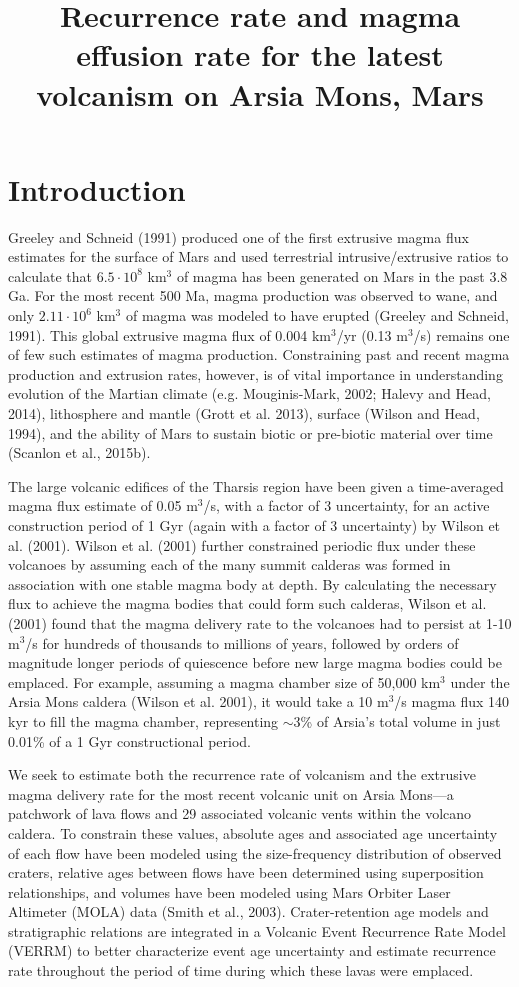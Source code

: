 \documentclass[12pt,letter]{article}
\title{Recurrence rate and magma effusion rate for the latest volcanism on Arsia Mons, Mars}
\date{}
\author{}
\begin{document}
\maketitle


\section{Introduction}

Greeley and Schneid (1991) produced one of the first extrusive magma flux estimates for the surface of Mars and used terrestrial intrusive/extrusive ratios to calculate that $6.5\cdot 10^8$ km$^3$ of magma has been generated on Mars in the past 3.8 Ga. For the most recent 500 Ma, magma production was observed to wane, and only $2.11\cdot 10^6$ km$^3$ of magma was modeled to have erupted (Greeley and Schneid, 1991). This global extrusive magma flux of 0.004 km$^3$/yr (0.13 m$^3$/s) remains one of few such estimates of magma production. Constraining past and recent magma production and extrusion rates, however, is of vital importance in understanding evolution of the Martian climate (e.g. Mouginis-Mark, 2002; Halevy and Head, 2014), lithosphere and mantle (Grott et al. 2013), surface (Wilson and Head, 1994), and the ability of Mars to sustain biotic or pre-biotic material over time (Scanlon et al., 2015b).

The large volcanic edifices of the Tharsis region have been given a time-averaged magma flux estimate of 0.05 m$^3$/s, with a factor of 3 uncertainty, for an active construction period of 1 Gyr (again with a factor of 3 uncertainty) by Wilson et al. (2001). Wilson et al. (2001) further constrained periodic flux under these volcanoes by assuming each of the many summit calderas was formed in association with one stable magma body at depth. By calculating the necessary flux to achieve the magma bodies that could form such calderas, Wilson et al. (2001) found that the magma delivery rate to the volcanoes had to persist at 1-10 m$^3$/s for hundreds of thousands to millions of years, followed by orders of magnitude longer periods of quiescence before new large magma bodies could be emplaced. For example, assuming a magma chamber size of 50,000 km$^3$ under the Arsia Mons caldera (Wilson et al. 2001), it would take a 10 m$^3$/s magma flux 140 kyr to fill the magma chamber, representing $\sim$3\% of Arsia's total volume in just 0.01\% of a 1 Gyr constructional period.

We seek to estimate both the recurrence rate of volcanism and the extrusive magma delivery rate for the most recent volcanic unit on Arsia Mons—a patchwork of lava flows and 29 associated volcanic vents within the volcano caldera. To constrain these values, absolute ages and associated age uncertainty of each flow have been modeled using the size-frequency distribution of observed craters, relative ages between flows have been determined using superposition relationships, and volumes have been modeled using Mars Orbiter Laser Altimeter (MOLA) data (Smith et al., 2003). Crater-retention age models and stratigraphic relations are integrated in a Volcanic Event Recurrence Rate Model (VERRM) to better characterize event age uncertainty and estimate recurrence rate throughout the period of time during which these lavas were emplaced.
\end{document}

